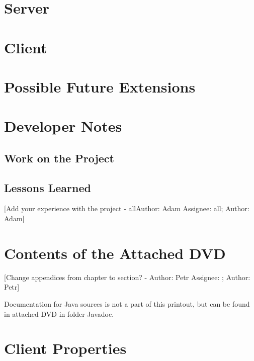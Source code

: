 \documentclass[12pt,a4paper]{report}
\makeatletter
\newcommand{\comment}[3][\@empty]{
  {\color{magenta}[#3 - }
  {\color{green}\ifx\@empty#1\relax Author: #2 \else Assignee: #1; Author: #2\fi}{\color{magenta}]}
}
\makeatother
\begin{document}
\chapter{Server}


\chapter{Client}


%


\chapter{Possible Future Extensions}


\chapter{Developer Notes}
\section{Work on the Project}


\section{Lessons Learned}
\comment[all]{Adam}{Add your experience with the project}

\appendix
\chapter{Contents of the Attached DVD}
\label{app:DVD}

\comment{Petr}{Change appendices from chapter to section?}

Documentation for Java sources is not a part of this printout, but can be found
in attached DVD in folder Javadoc.

\chapter{Client Properties}

\label{app:ClientProperties}
\end{document}
